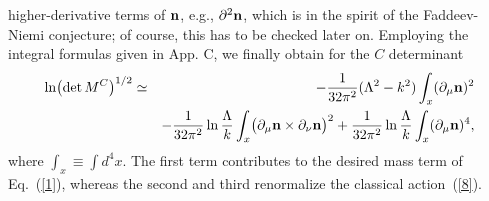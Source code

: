 \documentclass[a4paper,12pt]{article}
\newcommand{\re}[1]{~(\ref{#1})}
\begin{document}
higher-derivative terms of $\mathbf{n}$, e.g., $\partial^2\mathbf{n}$, which is in
the spirit of the Faddeev-Niemi conjecture; of course, this has to be
checked later on. Employing the integral formulas given in App. C, we
finally obtain for the $C$ determinant 
\begin{eqnarray}
\ln\bigl(\det M^C\bigr)^{1/2} &\simeq &-\frac{1}{32 \pi^2}
(\Lambda^2-k^2) \int_x (\partial_\mu\mathbf{n})^2 \nonumber\\
&&-\frac{1}{32\pi^2}\ln\frac{\Lambda}{k} \int_x \bigl(
\partial_\mu\mathbf{n}\times\partial_\nu\mathbf{n}\bigr)^2 
+ \frac{1}{32\pi^2} \ln\frac{\Lambda}{k} \int_x (\partial_\mu\mathbf{n})^4,
\label{12}
\end{eqnarray}
where $\int_x\equiv \int d^4x$. The first term contributes to the
desired mass term of Eq.\re{1}, whereas the second and third
renormalize the classical action\re{8}. 
\end{document}
